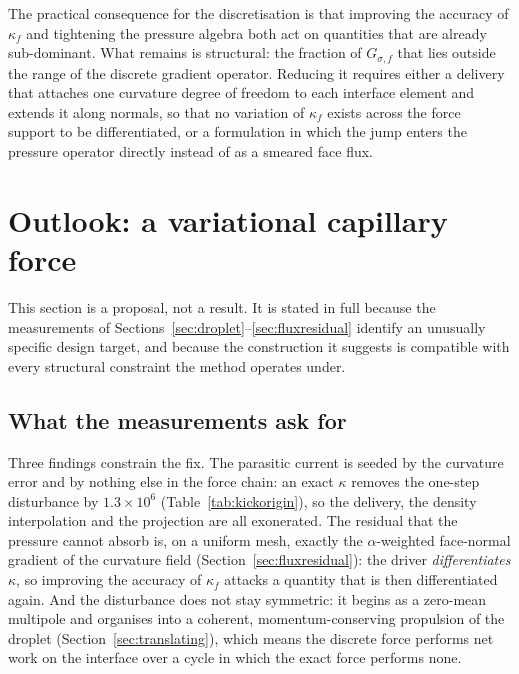 \documentclass[preprint,3p,11pt]{elsarticle}
\begin{document}
The practical consequence for the discretisation is that improving the accuracy of $\kappa_f$ and
tightening the pressure algebra both act on quantities that are already sub-dominant. What
remains is structural: the fraction of $G_{\sigma,f}$ that lies outside the range of the discrete
gradient operator. Reducing it requires either a delivery that attaches one curvature degree of
freedom to each interface element and extends it along normals, so that no variation of $\kappa_f$
exists across the force support to be differentiated, or a formulation in which the jump enters
the pressure operator directly instead of as a smeared face flux.

\section{Outlook: a variational capillary force}
\label{sec:variational}
This section is a proposal, not a result. It is stated in full because the measurements of
Sections~\ref{sec:droplet}--\ref{sec:fluxresidual} identify an unusually specific design
target, and because the construction it suggests is compatible with every structural
constraint the method operates under.

\subsection{What the measurements ask for}
Three findings constrain the fix. The parasitic current is seeded by the curvature error
and by nothing else in the force chain: an exact $\kappa$ removes the one-step disturbance
by $1.3\times10^{6}$ (Table~\ref{tab:kickorigin}), so the delivery, the density
interpolation and the projection are all exonerated. The residual that the pressure cannot
absorb is, on a uniform mesh, exactly the $\alpha$-weighted face-normal gradient of the
curvature field (Section~\ref{sec:fluxresidual}): the driver \emph{differentiates} $\kappa$,
so improving the accuracy of $\kappa_f$ attacks a quantity that is then differentiated
again. And the disturbance does not stay symmetric: it begins as a zero-mean multipole and
organises into a coherent, momentum-conserving propulsion of the droplet
(Section~\ref{sec:translating}), which means the discrete force performs net work on the
interface over a cycle in which the exact force performs none.
\end{document}
